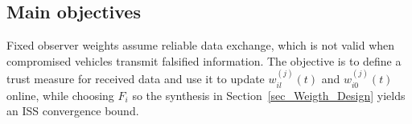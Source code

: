 \documentclass{ifacconf}
\def\LO{\mathcal{LO}} %
\def\DO{\mathcal{DO}} %
\begin{document}
    


    

    



\subsection{Main objectives}
\vspace*{-0.3cm}
Fixed observer weights assume reliable data exchange, which is not valid when compromised vehicles transmit falsified information. The objective is to define a trust measure for received data and use it to update $w_{il}^{(j)}(t)$ and $w_{i0}^{(j)}(t)$ online, while choosing $F_i$ so the synthesis in Section~\ref{sec_Weigth_Design} yields an ISS convergence bound.
\end{document}

